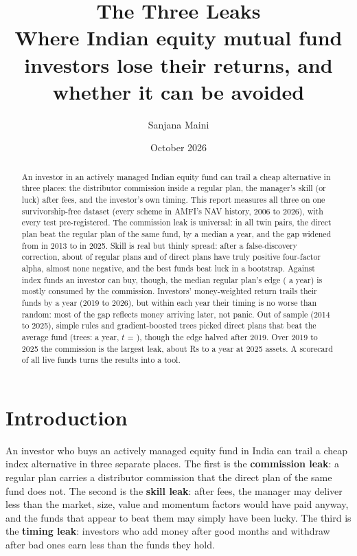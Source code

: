 \documentclass[11pt]{article}
\title{\sffamily\color{accent}\textbf{The Three Leaks}\\[4pt]\large Where Indian equity mutual fund investors lose their returns, and whether it can be avoided}
\author{Sanjana Maini}
\date{October 2026}
\begin{document}
\maketitle

\begin{abstract}
An investor in an actively managed Indian equity fund can trail a cheap alternative in three places: the distributor commission inside a regular plan, the manager's skill (or luck) after fees, and the investor's own timing. This report measures all three on one survivorship-free dataset (every scheme in AMFI's NAV history, 2006 to 2026), with every test pre-registered. The commission leak is universal: in all \CommissionPairs{} twin pairs, the direct plan beat the regular plan of the same fund, by a median \CommissionGapMedian{} a year, and the gap widened from \CommissionYearTwoZeroOneThreeMedian{} in 2013 to \CommissionYearTwoZeroTwoFiveMedian{} in 2025. Skill is real but thinly spread: after a false-discovery correction, about \SkillRegPiPlus{} of regular plans and \SkillDirPiPlus{} of direct plans have truly positive four-factor alpha, almost none negative, and the best funds beat luck in a bootstrap. Against index funds an investor can buy, though, the median regular plan's edge (\StyleRegMedianAlpha{} a year) is mostly consumed by the commission. Investors' money-weighted return trails their funds by \TimingGap{} a year (2019 to 2026), but within each year their timing is no worse than random: most of the gap reflects money arriving later, not panic. Out of sample (2014 to 2025), simple rules and gradient-boosted trees picked direct plans that beat the average fund (trees: \SelDirGbtVsall{} a year, $t$ = \SelDirGbtVsallT), though the edge halved after 2019. Over 2019 to 2025 the commission is the largest leak, about Rs \SynRsCommissionLowCr{} to \SynRsCommissionHighCr{} a year at 2025 assets. A scorecard of all \CardFunds{} live funds turns the results into a tool.
\end{abstract}

\section{Introduction}
An investor who buys an actively managed equity fund in India can trail a cheap index alternative in three separate places. The first is the \textbf{commission leak}: a regular plan carries a distributor commission that the direct plan of the same fund does not. The second is the \textbf{skill leak}: after fees, the manager may deliver less than the market, size, value and momentum factors would have paid anyway, and the funds that appear to beat them may simply have been lucky. The third is the \textbf{timing leak}: investors who add money after good months and withdraw after bad ones earn less than the funds they hold.
\end{document}
